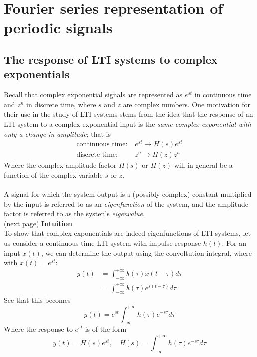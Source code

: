 \documentclass{report}
\begin{document}
\chapter{Fourier series representation of periodic signals}
\section{The response of LTI systems to complex\\exponentials}
Recall that complex exponential signals are represented as $e^{st}$ in continuous time and $z^n$ in discrete time, where $s$ and $z$ are complex numbers. 
One motivation for their use in the study of LTI systems stems from the idea that the response of an LTI system to a complex exponential input is the \textit{same complex exponential with only a change
in amplitude}; that is
\begin{align*}
\text{continuous time: }&e^{st}\to H(s)e^{st}\\
\text{discrete time: }&z^n\to H(z)z^n
\end{align*}
Where the complex amplitude factor $H(s)$ or $H(z)$ will in general be a function of the complex variable $s$ or $z$.\\
\vspace{1mm}\\
A signal for which the system output is a (possibly complex) constant multiplied by the input is referred to as an \textit{eigenfunction} of the system, and the amplitude factor is referred to as the
systen's \textit{eigenvalue}.\\
(next page)\newpage
\noindent\textbf{Intuition}\\
To show that complex exponentials are indeed eigenfunctions of LTI systems, let us consider a continuous-time LTI system with impulse response $h(t)$. For an input $x(t)$, we can determine the output
using the convoltution integral, where with $x(t)=e^{st}$:
\begin{align*}
y(t)&=\int^{+\infty}_{-\infty}h(\tau)x(t-\tau)d\tau\\
&=\int^{+\infty}_{-\infty}h(\tau)e^{s(t-\tau)}d\tau
\end{align*}
See that this becomes
\begin{equation*}
y(t)=e^{st}\int^{+\infty}_{-\infty}h(\tau)e^{-s\tau}d\tau
\end{equation*}
Where the response to $e^{st}$ is of the form
\begin{equation*}
y(t)=H(s)e^{st},\quad H(s)=\int^{+\infty}_{-\infty}h(\tau)e^{-s\tau}d\tau
\end{equation*}
\end{document}
